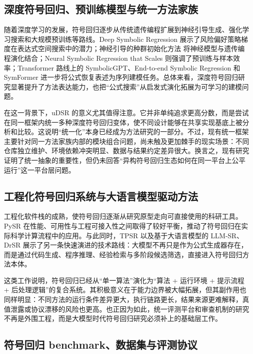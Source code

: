 \documentclass[UTF8,12pt]{ctexart}
\begin{document}
\subsection{深度符号回归、预训练模型与统一方法家族}

随着深度学习的发展，符号回归逐步从传统遗传编程扩展到神经引导生成、强化学习搜索和大规模预训练等路线。Deep Symbolic Regression \citep{petersen2021deep} 展示了风险偏好策略梯度在表达式空间搜索中的潜力；神经引导的种群初始化方法 \citep{mundhenk2021seeding} 将神经模型与遗传编程演化结合；Neural Symbolic Regression that Scales \citep{biggio2021nsr} 则强调了预训练与样本效率；Transformer 路线上的 SymbolicGPT、End-to-end Symbolic Regression 和 SymFormer \citep{valipour2021symbolicgpt,kamienny2022end,vastl2022symformer} 进一步将公式恢复表述为序列建模任务。总体来看，深度符号回归研究显著提升了方法表达能力，也把“公式搜索”从启发式演化拓展为可学习的建模问题。

在这一背景下，uDSR \citep{landajuela2022udsr} 的意义尤其值得注意。它并非单纯追求更高分数，而是尝试在同一框架内统一多种深度符号回归变体，使不同设计能够在共享实现基底上被分析和比较。这说明“统一化”本身已经成为方法研究的一部分。不过，现有统一框架主要针对同一方法家族内部的模块组合问题，尚未触及更加棘手的现实场景：不同仓库独立维护、环境依赖冲突明显、数据与结果约定差异很大。换言之，现有研究证明了统一抽象的重要性，但仍未回答“异构符号回归生态如何在同一平台上公平运行”这一平台层问题。

\subsection{工程化符号回归系统与大语言模型驱动方法}

工程化软件栈的成熟，使符号回归逐渐从研究原型走向可直接使用的科研工具。PySR \citep{cranmer2023pysr} 在性能、可用性与工程可接入性之间取得了较好平衡，推动了符号回归在实际科学计算流程中的应用。与此同时，TPSR \citep{tpsr2023} 以及基于大语言模型的 LLM-SR、DrSR \citep{shojaee2024llm,wang2025drsr} 展示了另一条快速演进的技术路线：大模型不再只是作为公式生成器存在，而是通过代码生成、程序推理、经验检索与多阶段候选筛选，直接进入符号回归方法本体。

这类工作说明，符号回归已经从“单一算法”演化为“算法 + 运行环境 + 提示流程 + 后处理逻辑”的复合系统。其积极意义在于能力边界被大幅拓展，但其副作用也同样明显：不同方法的运行条件差异更大，执行链路更长，结果来源更难解释，真值泄露或协议漂移的风险也更高。也正因为如此，统一评测平台和审查机制的研究不再是外围工程，而是大模型时代符号回归研究必须补上的基础层工作。

\subsection{符号回归 benchmark、数据集与评测协议}
\end{document}
